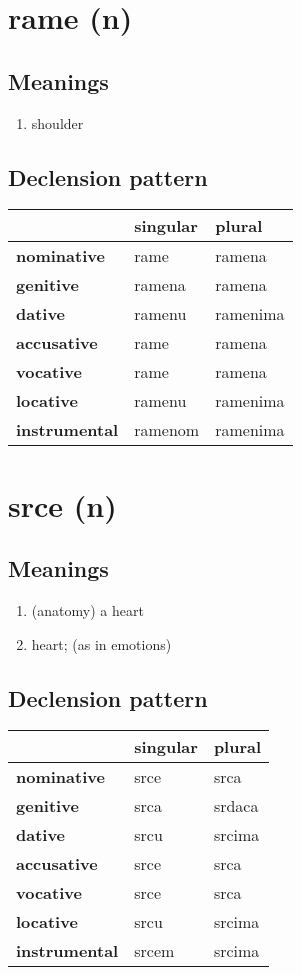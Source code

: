 \filbreak
\section{rame (n)}
\subsection*{Meanings}
\begin{enumerate}
\item shoulder
\end{enumerate}
\subsection*{Declension pattern}
\begin{tabularx}{\linewidth}{Xll}
\toprule
{} & singular &    plural \\
\midrule
\textbf{nominative  } &     rame &    ramena \\
\textbf{genitive    } &   ramena &    ramena \\
\textbf{dative      } &   ramenu &  ramenima \\
\textbf{accusative  } &     rame &    ramena \\
\textbf{vocative    } &     rame &    ramena \\
\textbf{locative    } &   ramenu &  ramenima \\
\textbf{instrumental} &  ramenom &  ramenima \\
\bottomrule
\end{tabularx}

\filbreak
\section{srce (n)}
\subsection*{Meanings}
\begin{enumerate}
\item (anatomy) a heart
\item heart; (as in emotions)
\end{enumerate}
\subsection*{Declension pattern}
\begin{tabularx}{\linewidth}{Xll}
\toprule
{} & singular &  plural \\
\midrule
\textbf{nominative  } &     srce &    srca \\
\textbf{genitive    } &     srca &  srdaca \\
\textbf{dative      } &     srcu &  srcima \\
\textbf{accusative  } &     srce &    srca \\
\textbf{vocative    } &     srce &    srca \\
\textbf{locative    } &     srcu &  srcima \\
\textbf{instrumental} &    srcem &  srcima \\
\bottomrule
\end{tabularx}

